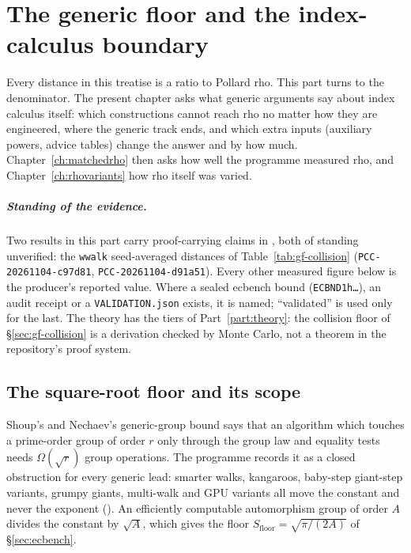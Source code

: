 
\chapter{The generic floor and the index-calculus boundary}\label{ch:genericfloor}

Every distance in this treatise is a ratio to Pollard rho. This part
turns to the denominator. The present chapter asks what generic arguments
say about index calculus itself: which constructions cannot reach rho no
matter how they are engineered, where the generic track ends, and which
extra inputs (auxiliary powers, advice tables) change the answer and by how
much. Chapter~\ref{ch:matchedrho} then asks how well the programme measured
rho, and Chapter~\ref{ch:rhovariants} how rho itself was varied.

\paragraph{Standing of the evidence.} Two results in this part carry
proof-carrying claims in , both of standing unverified:
the \texttt{wwalk} seed-averaged distances of Table~\ref{tab:gf-collision}
(\texttt{PCC-20261104-c97d81}, \texttt{PCC-20261104-d91a51}). Every other
measured figure below is the producer's reported value. Where a
sealed ecbench bound (\texttt{ECBND1h\ldots}), an audit receipt or a
\texttt{VALIDATION.json} exists, it is named; ``validated'' is used only
for the last. The theory has the tiers of Part~\ref{part:theory}: the
collision floor of \S\ref{sec:gf-collision} is a derivation checked by
Monte Carlo, not a theorem in the repository's proof system.

\section{The square-root floor and its scope}\label{sec:gf-shoup}

Shoup's and Nechaev's generic-group bound says that an algorithm which
touches a prime-order group of order $r$ only through the group law and
equality tests needs $\Omega(\sqrt r)$ group operations. The programme
records it as a closed obstruction for every generic lead: smarter walks,
kangaroos, baby-step giant-step variants, grumpy giants, multi-walk and GPU
variants all move the constant and never the exponent
().
An efficiently computable automorphism group of order $A$ divides the
constant by $\sqrt A$, which gives the floor $S_{\text{floor}}=\sqrt{\pi/(2A)}$
of \S\ref{sec:ecbench}.

